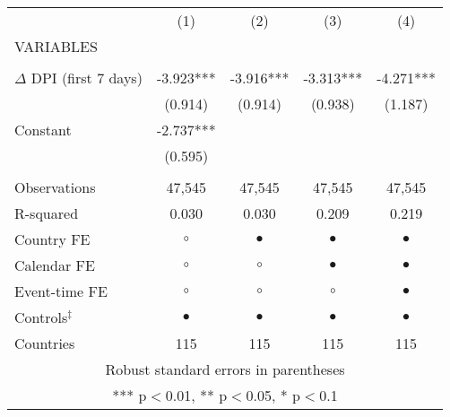 \begin{tabular}{lcccc} \hline
 & (1) & (2) & (3) & (4) \\
VARIABLES &  &  &  &  \\ \hline
 &  &  &  &  \\
$\Delta$ DPI (first 7 days) & -3.923*** & -3.916*** & -3.313*** & -4.271*** \\
 & (0.914) & (0.914) & (0.938) & (1.187) \\
Constant & -2.737*** &  &  &  \\
 & (0.595) &  &  &  \\
 &  &  &  &  \\
Observations & 47,545 & 47,545 & 47,545 & 47,545 \\
R-squared & 0.030 & 0.030 & 0.209 & 0.219 \\
Country FE & $ \circ $ & $ \bullet $ & $ \bullet $ & $ \bullet $ \\
Calendar FE & $ \circ $ & $ \circ $ & $ \bullet $ & $ \bullet $ \\
Event-time FE & $ \circ $ & $ \circ $ & $ \circ $ & $ \bullet $ \\
Controls$^\ddag$ & $ \bullet $ & $ \bullet $ & $ \bullet $ & $ \bullet $ \\
 Countries & 115 & 115 & 115 & 115 \\ \hline
\multicolumn{5}{c}{ Robust standard errors in parentheses} \\
\multicolumn{5}{c}{ *** p$<$0.01, ** p$<$0.05, * p$<$0.1} \\
\end{tabular}
